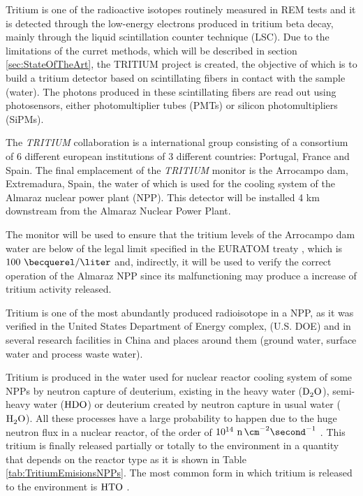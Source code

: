 Tritium is one of the radioactive isotopes routinely measured in REM tests and it is detected through the low-energy electrons produced in tritium beta decay, mainly through the liquid scintillation counter technique (LSC). Due to the limitations of the curret methods, which will be described in section \ref{sec:StateOfTheArt}, the TRITIUM project is created, the objective of which is to build a tritium detector based on scintillating fibers in contact with the sample (water). The photons produced in these scintillating fibers are read out using photosensors, either photomultiplier tubes (PMTs) or silicon photomultipliers (SiPMs). 

The \textit{TRITIUM} collaboration is a international group consisting of a consortium of 6 different european institutions of 3 different countries: Portugal, France and Spain. The final emplacement of the \textit{TRITIUM} monitor is the Arrocampo dam, Extremadura, Spain, the water of which is used for the cooling system of the Almaraz nuclear power plant (NPP). This detector will be installed 4 km downstream from the Almaraz Nuclear Power Plant.

The monitor will be used to ensure that the tritium levels of the Arrocampo dam  water are below of the legal limit specified in the EURATOM treaty \cite{100BqL}, which is $100~\becquerel/\liter$ and, indirectly, it will be used to verify the correct operation of the Almaraz NPP since its malfunctioning may produce a increase of tritium activity released.

Tritium is one of the most abundantly produced radioisotope in a NPP, as it was verified in the United States Department of Energy complex, (U.S. DOE) \cite{FiberDetector1a, FiberDetector1b} and in several research facilities in China \cite{CommonEmissionTritium} and places around them (ground water, surface water and process waste water).

Tritium is produced in the water used for nuclear reactor cooling system of some NPPs by neutron capture of deuterium, existing in the heavy water ($\ce{D_2 O}$), semi-heavy water ($\ce{H D O}$) or deuterium created by neutron capture in usual water ($\ce{H_2 O}$). All these processes have a large probability to happen due to the huge neutron flux in a nuclear reactor, of the order of $10^{14} ~\ce{n} \, \cm^{-2} \second^{-1}$ \cite{CrossSeccionNeutrons}. This tritium is finally released partially or totally to the environment in a quantity that depends on the reactor type as it is shown in Table \ref{tab:TritiumEmisionsNPPs}. The most common form in which tritium is released to the environment is $\ce{HTO}$ \cite{CommonEmissionTritium}.

